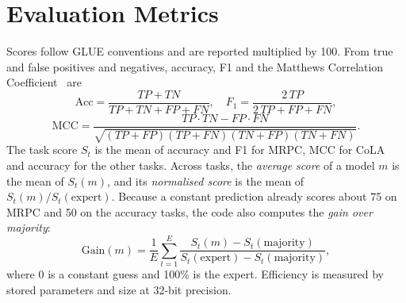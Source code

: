 \section{Evaluation Metrics}

Scores follow GLUE conventions and are reported multiplied by 100. From true and false positives and negatives, accuracy, F1 and the Matthews Correlation Coefficient~\cite{matthews1975mcc} are
\begin{equation}
\mathrm{Acc}=\frac{TP+TN}{TP+TN+FP+FN},\quad
F_1=\frac{2\,TP}{2\,TP+FP+FN},
\end{equation}
\begin{equation}\mathrm{MCC}=\frac{TP\cdot TN-FP\cdot FN}{\sqrt{(TP+FP)(TP+FN)(TN+FP)(TN+FN)}} .
\end{equation}
The task score $S_t$ is the mean of accuracy and F1 for MRPC, MCC for CoLA and accuracy for the other tasks. Across tasks, the \emph{average score} of a model $m$ is the mean of $S_t(m)$, and its \emph{normalised score} is the mean of $S_t(m)/S_t(\mathrm{expert})$. Because a constant prediction already scores about 75 on MRPC and 50 on the accuracy tasks, the code also computes the \emph{gain over majority}:
\begin{equation}
\mathrm{Gain}(m)=\frac{1}{E}\sum_{t=1}^{E}\frac{S_t(m)-S_t(\mathrm{majority})}{S_t(\mathrm{expert})-S_t(\mathrm{majority})},
\label{eq:gain}
\end{equation}
where 0 is a constant guess and 100\% is the expert. Efficiency is measured by stored parameters and size at 32-bit precision.

